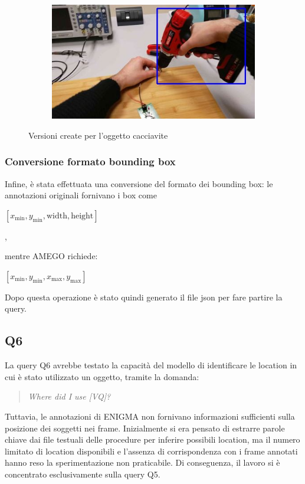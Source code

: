 \begin{figure}[ht]
\begin{subfigure}[b]{0.32\linewidth}
        \includegraphics[width=\linewidth]{Images/enigma_am_IMGVER3.jpg}
        \caption{}
        \label{fig:imgver3}
    \end{subfigure}
    \caption{Versioni create per l'oggetto cacciavite}
    \label{fig:enigma_am_screwdrivers}
\end{figure}

\subsubsection*{Conversione formato bounding box}
Infine, è stata effettuata una conversione del formato dei bounding box: le annotazioni originali fornivano i box come 
\begin{center}
\([x_\text{min}, y_\text{min}, \text{width}, \text{height}]\)
\end{center},

mentre AMEGO richiede:
\begin{center}
\([x_\text{min}, y_\text{min}, x_\text{max}, y_\text{max}]\)
\end{center}

Dopo questa operazione è stato quindi generato il file json per fare partire la query.

\subsection*{Q6}
La query Q6 avrebbe testato la capacità del modello di identificare le location in cui è stato utilizzato un oggetto, tramite la domanda:

\begin{quote}
\textit{Where did I use [VQ]?}
\end{quote}

Tuttavia, le annotazioni di ENIGMA non fornivano informazioni sufficienti sulla posizione dei soggetti nei frame. Inizialmente si era pensato di estrarre parole chiave dai file testuali delle procedure per inferire possibili location, ma il numero limitato di location disponibili e l'assenza di corrispondenza con i frame annotati hanno reso la sperimentazione non praticabile. Di conseguenza, il lavoro si è concentrato esclusivamente sulla query Q5.

